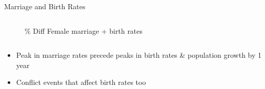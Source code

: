 \documentclass{beamer}
\begin{document}
\begin{frame}{Marriage and Birth Rates}
\begin{columns}
				\begin{column}{0.5\paperwidth}
					\begin{figure}
						\caption{\% Diff Female marriage + birth rates}
					\end{figure}
				\end{column}
			\end{columns}	

			\begin{itemize}
				\item Peak in marriage rates precede peaks in birth rates \& population growth by 1 year
				\item Conflict events that affect birth rates too
			\end{itemize}
		\end{frame}
\end{document}

